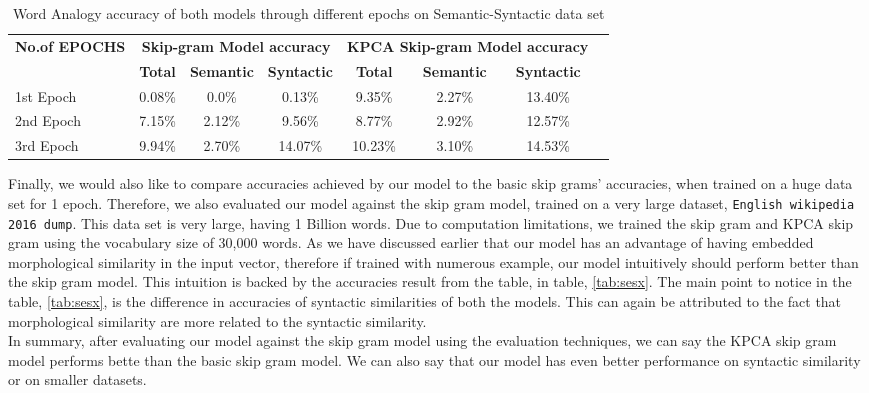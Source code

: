 \begin{table}[H]
	\centering
	\renewcommand{\arraystretch}{1.2}
	\begin{tabular}{|p{3cm}|c|c|c|c|c|c|c|}
		\hline
		\multirow{2}{5cm}{\textbf{No.of EPOCHS}} & \multicolumn{3}{c|}{\textbf{Skip-gram Model accuracy}} & \multicolumn{3}{c|}{\textbf{KPCA Skip-gram Model accuracy}}\\
		\cline{2-7}
		& \textbf{Total} & \textbf{Semantic} & \textbf{Syntactic} & \textbf{Total} & \textbf{Semantic} & \textbf{Syntactic}\\
		\hline
		1st Epoch&0.08\%&0.0\%&0.13\%&9.35\%&2.27\%&13.40\%\\ \hline
		2nd Epoch&7.15\%&2.12\%&9.56\%&8.77\%&2.92\%&12.57\%\\ \hline
		3rd Epoch&9.94\%&2.70\%&14.07\%&10.23\%&3.10\%&14.53\%\\ \hline
	\end{tabular}
	\caption{Word Analogy accuracy of both models through different epochs on Semantic-Syntactic data set}\label{ses2}
\end{table}
Finally, we would also like to compare accuracies achieved by our model to the basic skip grams' accuracies, when trained on a huge data set for 1 epoch. Therefore, we also evaluated our model against the skip gram model, trained on a very large dataset,  \texttt{English wikipedia 2016 dump}. This data set is very large, having 1 Billion words. Due to computation limitations, we trained the skip gram and KPCA skip gram using the vocabulary size of 30,000 words.
As we have discussed earlier that our model has an advantage of having embedded morphological similarity in the input vector, therefore if trained with numerous example, our model intuitively should perform better than the skip gram model. This intuition is backed by the accuracies result from the table, in table, \ref{tab:sesx}. The main point to notice in the table, \ref{tab:sesx}, is the difference in accuracies of syntactic similarities of both the models. This can again be attributed to the fact that morphological similarity are more related to the syntactic similarity.\\
In summary, after evaluating our model against the skip gram model using the evaluation techniques, we can say the KPCA skip gram model performs bette than the basic skip gram model. We can also say that our model has even better performance on syntactic similarity or on smaller datasets.

